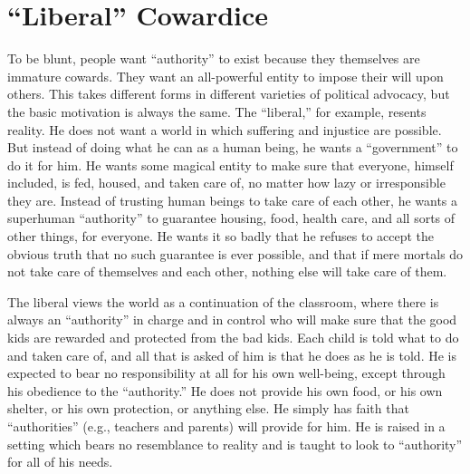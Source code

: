 \documentclass{book}
\begin{document}
\section{\enquote{Liberal} Cowardice}

To be blunt, people want \enquote{authority} to exist because they themselves are immature cowards. They want an all-powerful entity to impose their will upon others. This takes different forms in different varieties of political advocacy, but the basic motivation is always the same. The \enquote{liberal,} for example, resents reality. He does not want a world in which suffering and injustice are possible. But instead of doing what he can as a human being, he wants a \enquote{government} to do it for him. He wants some magical entity to make sure that everyone, himself included, is fed, housed, and taken care of, no matter how lazy or irresponsible they are. Instead of trusting human beings to take care of each other, he wants a superhuman \enquote{authority} to guarantee housing, food, health care, and all sorts of other things, for everyone. He wants it so badly that he refuses to accept the obvious truth that no such guarantee is ever possible, and that if mere mortals do not take care of themselves and each other, nothing else will take care of them.

The liberal views the world as a continuation of the classroom, where there is always an \enquote{authority} in charge and in control who will make sure that the good kids are rewarded and protected from the bad kids. Each child is told what to do and taken care of, and all that is asked of him is that he does as he is told. He is expected to bear no responsibility at all for his own well-being, except through his obedience to the \enquote{authority.} He does not provide his own food, or his own shelter, or his own protection, or anything else. He simply has faith that \enquote{authorities} (e.g., teachers and parents) will provide for him. He is raised in a setting which bears no resemblance to reality and is taught to look to \enquote{authority} for all of his needs.
\end{document}
